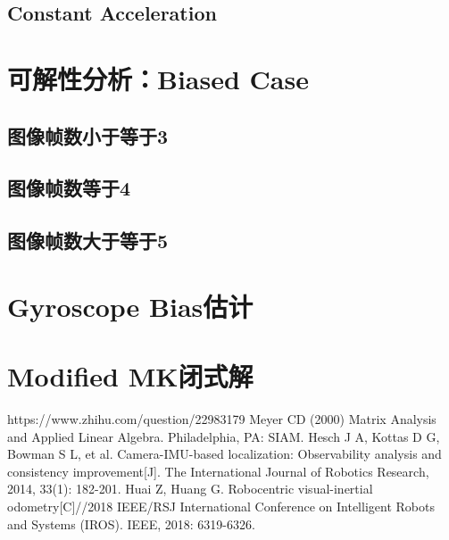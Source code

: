 \documentclass{article}
\begin{document}
\subsection{Constant Acceleration}

\section{可解性分析：Biased Case}
\subsection{图像帧数小于等于3}

\subsection{图像帧数等于4}

\subsection{图像帧数大于等于5}

\section{Gyroscope Bias估计}

\section{Modified MK闭式解}


\begin{thebibliography}{99}  
    https://www.zhihu.com/question/22983179
    Meyer CD (2000) Matrix Analysis and Applied Linear Algebra. Philadelphia, PA: SIAM.
     Hesch J A, Kottas D G, Bowman S L, et al. Camera-IMU-based localization: Observability analysis and consistency improvement[J]. The International Journal of Robotics Research, 2014, 33(1): 182-201.
     Huai Z, Huang G. Robocentric visual-inertial odometry[C]//2018 IEEE/RSJ International Conference on Intelligent Robots and Systems (IROS). IEEE, 2018: 6319-6326.
\end{thebibliography}
\end{document}
